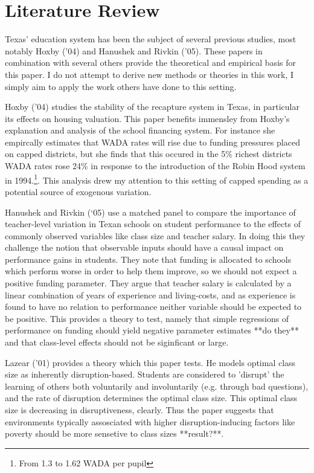 \documentclass[11pt]{article}
\begin{document}
\section{Literature Review}
\label{s:next}

Texas' education system has been the subject of several previous studies, most notably Hoxby ('04) and Hanushek and Rivkin ('05). These papers in combination with several others provide the theoretical and empirical basis for this paper. I do not attempt to derive new methods or theories in this work, I simply aim to apply the work others have done to this setting. 

Hoxby (’04) studies the stability of the recapture system in Texas, in particular its effects on housing valuation. This paper benefits immensley from Hoxby's explanation and analysis of the school financing system. For instance she empircally estimates that WADA rates will rise due to funding pressures placed on capped districts, but she finds that this occured in the 5\% richest districts WADA rates rose 24\% in response to the introduction of the Robin Hood system in 1994.\footnote{From 1.3 to 1.62 WADA per pupil}. This analysis drew my attention to this setting of capped spending as a potential source of exogenous variation. 

Hanushek and Rivkin (‘05) use a matched panel to compare the importance of teacher-level variation in Texan schools on student performance to the effects of commonly observed variables like class size and teacher salary. In doing this they challenge the notion that observable inputs should have a causal impact on performance gains in students. They note that funding is allocated to schools which perform worse in order to help them improve, so we should not expect a positive funding parameter. They argue that teacher salary is calculated by a linear combination of years of experience and living-costs, and as experience is found to have no relation to performance neither variable should be expected to be positive. This provides a theory to test, namely that simple regressions of performance on funding should yield negative parameter estimates **do they** and that class-level effects should not be siginficant or large. 

Lazear ('01) provides a theory which this paper tests. He models optimal class size as inherently disruption-based. Students are considered to 'disrupt' the learning of others both voluntarily and involuntarily (e.g. through bad questions), and the rate of disruption determines the optimal class size. This optimal class size is decreasing in disruptiveness, clearly. Thus the paper suggests that environments typically assosciated with higher disruption-inducing factors like poverty should be more sensetive to class sizes **result?**. 
\end{document}
